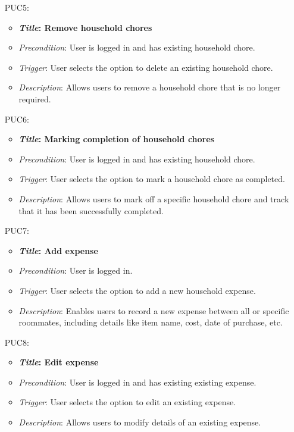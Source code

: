 \documentclass[12pt]{article}
\begin{document}
\begin{itemize}
    \item[PUC5:]
        \begin{itemize}
            \item \textbf{\textit{Title}: Remove household chores}
            \item \textit{Precondition}: User is logged in and has existing household chore.
            \item \textit{Trigger}: User selects the option to delete an existing household chore.
            \item \textit{Description}: Allows users to remove a household chore that is no longer required.
    \end{itemize}

    \item[PUC6:]
        \begin{itemize}
            \item \textbf{\textit{Title}: Marking completion of household chores}
            \item \textit{Precondition}: User is logged in and has existing household chore.
            \item \textit{Trigger}: User selects the option to mark a household chore as completed.
            \item \textit{Description}: Allows users to mark off a specific household chore and track that it has been successfully completed.
    \end{itemize}

    \item[PUC7:]
        \begin{itemize}
            \item \textbf{\textit{Title}: Add expense}
            \item \textit{Precondition}: User is logged in.
            \item \textit{Trigger}: User selects the option to add a new household expense.
            \item \textit{Description}: Enables users to record a new expense between all or specific roommates, including details like item name, cost, date of purchase, etc.
    \end{itemize}

    \item[PUC8:]
        \begin{itemize}
            \item \textbf{\textit{Title}: Edit expense}
            \item \textit{Precondition}: User is logged in and has existing existing expense.
            \item \textit{Trigger}: User selects the option to edit an existing expense.
            \item \textit{Description}: Allows users to modify details of an existing expense.
    \end{itemize}


\end{itemize}
\end{document}
